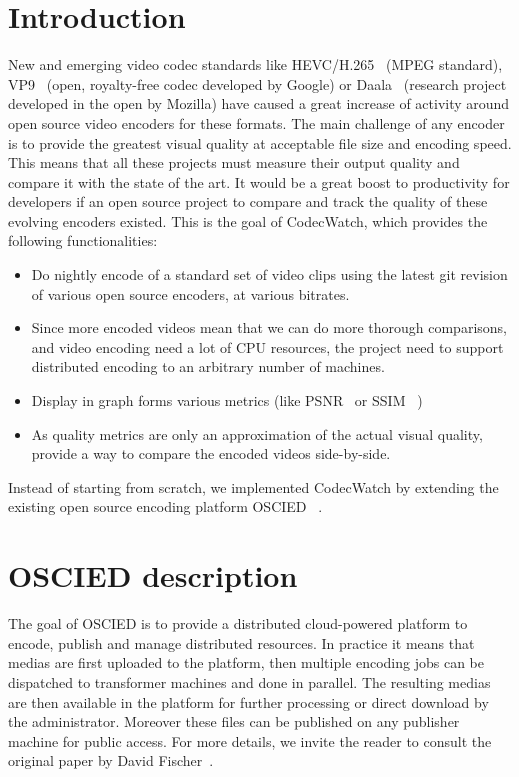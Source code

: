 \documentclass[a4paper,12pt]{article}
\begin{document}
%

\tableofcontents

\newpage

\section{Introduction}
New and emerging video codec standards like
HEVC/H.265~ \cite{hevc} (MPEG standard),
VP9~ \cite{vp9} (open, royalty-free codec
developed by Google) or Daala~ \cite{daala} (research
project developed in the open by Mozilla) have caused a great increase of
activity around open source video encoders for these formats. The main challenge
of any encoder is to provide the greatest visual quality at acceptable file size
and encoding speed. This means that all these projects must measure their output
quality and compare it with the state of the art. It would be a great boost to
productivity for developers if an open source project to compare and track the
quality of these evolving encoders existed. This is the goal of CodecWatch,
which provides the following functionalities:
\begin{itemize}
\item Do nightly encode of a standard set of video clips using the latest git
revision of various open source encoders, at various bitrates.
\item Since more encoded videos mean that we can do more thorough comparisons,
  and video encoding need a lot of CPU resources, the project need to support
  distributed encoding to an arbitrary number of machines.
\item Display in graph forms various metrics (like
    PSNR~ \cite{psnr} or
    SSIM~ \cite{ssim})
\item As quality metrics are only an approximation of the actual visual quality,
provide a way to compare the encoded videos side-by-side.
\end{itemize} Instead of starting from scratch, we implemented CodecWatch by
extending the existing open source encoding platform
OSCIED~ \cite{oscied}.

\section{OSCIED description}
The goal of OSCIED is to provide a distributed cloud-powered platform to encode,
publish and manage distributed resources.  In practice it means that medias are
first uploaded to the platform, then multiple encoding jobs can be dispatched to
transformer machines and done in parallel.  The resulting medias are then
available in the platform for further processing or direct download by the
administrator.  Moreover these files can be published on any publisher machine
for public access.
For more details, we invite the reader to consult the original paper by David
Fischer~\cite{df_thesis}.
\end{document}
